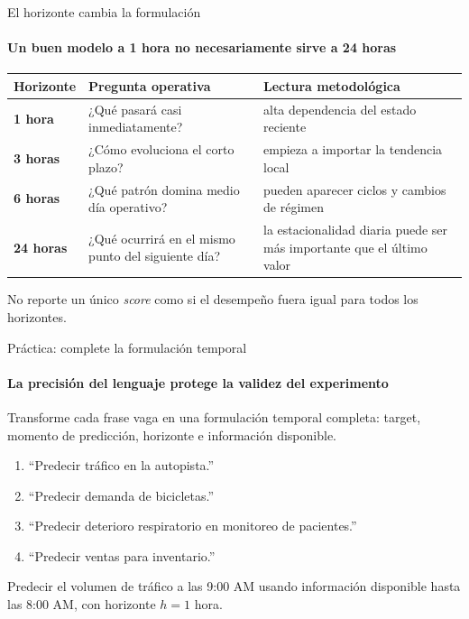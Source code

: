 \documentclass[aspectratio=169,11pt]{beamer}  %
\newcommand{\hrow}{\rowcolor{mlcream}}
\begin{document}
\begin{frame}{El horizonte cambia la formulación}
\framesubtitle{Un buen modelo a 1 hora no necesariamente sirve a 24 horas}
\centering
\begin{tabular}{@{}l P{0.39\textwidth} P{0.41\textwidth}@{}}
\toprule
\hrow \textbf{Horizonte} & Pregunta operativa & Lectura metodológica\\
\midrule
\textbf{1 hora} & ¿Qué pasará casi inmediatamente? & alta dependencia del estado reciente\\
\textbf{3 horas} & ¿Cómo evoluciona el corto plazo? & empieza a importar la tendencia local\\
\textbf{6 horas} & ¿Qué patrón domina medio día operativo? & pueden aparecer ciclos y cambios de régimen\\
\textbf{24 horas} & ¿Qué ocurrirá en el mismo punto del siguiente día? & la estacionalidad diaria puede ser más importante que el último valor\\
\bottomrule
\end{tabular}

\vspace{0.8em}
No reporte un único \emph{score} como si el desempeño fuera igual para todos los horizontes.
\end{frame}

\begin{frame}{Práctica: complete la formulación temporal}
\framesubtitle{La precisión del lenguaje protege la validez del experimento}
\begin{taskbox}
Transforme cada frase vaga en una formulación temporal completa: target, momento de predicción, horizonte e información disponible.
\end{taskbox}
\begin{enumerate}
\item ``Predecir tráfico en la autopista.''
\item ``Predecir demanda de bicicletas.''
\item ``Predecir deterioro respiratorio en monitoreo de pacientes.''
\item ``Predecir ventas para inventario.''
\end{enumerate}
\begin{goldbox}
Predecir el volumen de tráfico a las 9:00 AM usando información disponible hasta las 8:00 AM, con horizonte $h=1$ hora.
\end{goldbox}
\end{frame}
\end{document}
